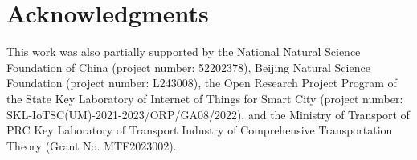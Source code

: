 \documentclass[lettersize,journal]{IEEEtran}
\begin{document}
\section*{Acknowledgments}
This work was also partially supported by the National Natural Science Foundation of China (project number:
52202378), Beijing Natural Science Foundation (project number: L243008), the Open Research Project Program of the State Key Laboratory of Internet of Things for Smart City (project number: SKL-IoTSC(UM)-2021-2023/ORP/GA08/2022), and the Ministry of Transport of PRC Key Laboratory of Transport Industry of Comprehensive Transportation Theory (Grant No. MTF2023002).












\end{document}
